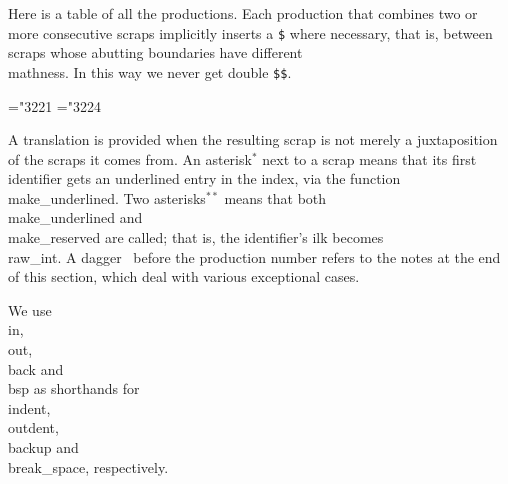
%

Here is a table of all the productions.  Each production that
combines two or more consecutive scraps implicitly inserts a {\tt \$}
where necessary, that is, between scraps whose abutting boundaries
have different \\{mathness}.  In this way we never get double {\tt\$\$}.

\fi \newcount\prodno \newdimen\midcol \let\+\relax \ifon

\def\v{\char'174}
\mathchardef\RA="3221 %
\mathchardef\BA="3224 %

A translation is provided when the resulting scrap is not merely a
juxtaposition of the scraps it comes from.  An asterisk$^*$ next to a scrap
means that its first identifier gets an underlined entry in the index,
via the function \\{make\_underlined}.  Two asterisks$^{**}$ means that both
\\{make\_underlined} and \\{make\_reserved} are called; that is, the
identifier's ilk becomes \\{raw\_int}.  A dagger \dag\ before the
production number refers to the notes at the end of this section,
which deal with various exceptional cases.

We use \\{in}, \\{out}, \\{back} and
\\{bsp} as shorthands for \\{indent}, \\{outdent}, \\{backup} and
\\{break\_space}, respectively.

